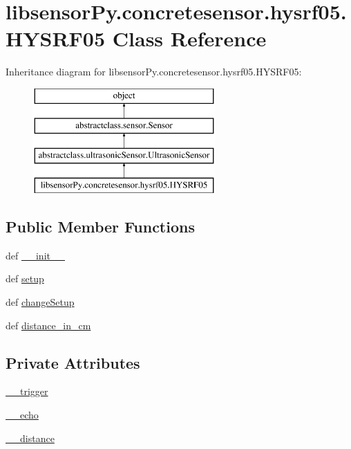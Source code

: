 \hypertarget{classlibsensorPy_1_1concretesensor_1_1hysrf05_1_1HYSRF05}{}\section{libsensor\+Py.\+concretesensor.\+hysrf05.\+H\+Y\+S\+R\+F05 Class Reference}
\label{classlibsensorPy_1_1concretesensor_1_1hysrf05_1_1HYSRF05}
Inheritance diagram for libsensor\+Py.\+concretesensor.\+hysrf05.\+H\+Y\+S\+R\+F05\+:\begin{figure}[H]
\begin{center}
\leavevmode
\includegraphics[height=4.000000cm]{classlibsensorPy_1_1concretesensor_1_1hysrf05_1_1HYSRF05}
\end{center}
\end{figure}
\subsection*{Public Member Functions}
\begin{DoxyCompactItemize}
\item 
def \hyperlink{classlibsensorPy_1_1concretesensor_1_1hysrf05_1_1HYSRF05_a724955cfce87aa88f7aa3b77da4647fc}{\+\_\+\+\_\+init\+\_\+\+\_\+}
\item 
def \hyperlink{classlibsensorPy_1_1concretesensor_1_1hysrf05_1_1HYSRF05_aeefcdf90da81f01a8caa7a465a1bfc64}{setup}
\item 
def \hyperlink{classlibsensorPy_1_1concretesensor_1_1hysrf05_1_1HYSRF05_a661f229fd164753247229a1c1efbd969}{change\+Setup}
\item 
def \hyperlink{classlibsensorPy_1_1concretesensor_1_1hysrf05_1_1HYSRF05_a5a838ecb9b983452f5b43a2c59302244}{distance\+\_\+in\+\_\+cm}
\end{DoxyCompactItemize}
\subsection*{Private Attributes}
\begin{DoxyCompactItemize}
\item 
\hyperlink{classlibsensorPy_1_1concretesensor_1_1hysrf05_1_1HYSRF05_ab55a6595e7fa19a1b5cd06f22fff616e}{\+\_\+\+\_\+trigger}
\item 
\hyperlink{classlibsensorPy_1_1concretesensor_1_1hysrf05_1_1HYSRF05_a28ba88be366d6e9a370ef5d95551c52b}{\+\_\+\+\_\+echo}
\item 
\hyperlink{classlibsensorPy_1_1concretesensor_1_1hysrf05_1_1HYSRF05_a939326552462e59b017d7acfa77aa303}{\+\_\+\+\_\+distance}
\end{DoxyCompactItemize}


